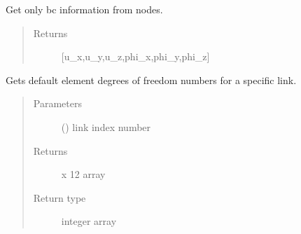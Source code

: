 \documentclass[letterpaper,10pt,english]{sphinxmanual}
\begin{document}
\begin{fulllineitems}
\begin{fulllineitems}
\end{fulllineitems}


\begin{fulllineitems}
\label{\detokenize{api:beamon.database.Database.get_bc}}
Get only bc information from nodes.
\begin{quote}\begin{description}
\item[{Returns}] \leavevmode
{[}u\_x,u\_y,u\_z,phi\_x,phi\_y,phi\_z{]}

\end{description}\end{quote}

\end{fulllineitems}


\begin{fulllineitems}
\label{\detokenize{api:beamon.database.Database.get_default_edof}}
Gets default element degrees of freedom numbers for a specific link.
\begin{quote}\begin{description}
\item[{Parameters}] \leavevmode
{} () \textendash{} link index number

\item[{Returns}]  x 12 array

\item[{Return type}] \leavevmode
integer array

\end{description}\end{quote}

\end{fulllineitems}



\end{fulllineitems}
\end{document}
